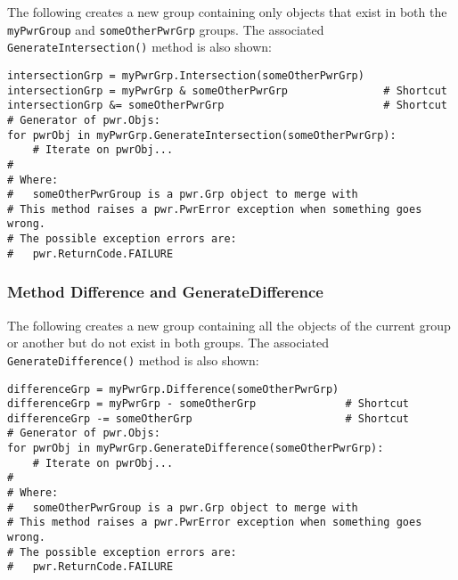 \documentclass[12pt]{report} %
\providecommand{\DIFdeltex}[1]{{\protect\color{red}\sout{#1}}}                      %
\providecommand{\DIFaddbegin}{} %
\providecommand{\DIFaddend}{} %
\providecommand{\DIFdelbegin}{} %
\providecommand{\DIFdelend}{} %
\providecommand{\DIFdel}[1]{\texorpdfstring{\DIFdeltex{#1}}{}} %
\newcommand{\DIFscaledelfig}{0.5}
\newlength{\DIFdelgraphicswidth} %
\newlength{\DIFdelgraphicsheight} %
\newcommand{\DIFaddincludegraphics}[2][]{{\color{blue}\fbox{\DIFOincludegraphics[#1]{#2}}}} %
\newcommand{\DIFdelincludegraphics}[2][]{%
\sbox{\DIFdelgraphicsbox}{\DIFOincludegraphics[#1]{#2}}%
\settoboxwidth{\DIFdelgraphicswidth}{\DIFdelgraphicsbox} %
\settoboxtotalheight{\DIFdelgraphicsheight}{\DIFdelgraphicsbox} %
\scalebox{\DIFscaledelfig}{%
\parbox[b]{\DIFdelgraphicswidth}{\usebox{\DIFdelgraphicsbox}\\[-\baselineskip] \rule{\DIFdelgraphicswidth}{0em}}\llap{\resizebox{\DIFdelgraphicswidth}{\DIFdelgraphicsheight}{%
\setlength{\unitlength}{\DIFdelgraphicswidth}%
\begin{picture}(1,1)%
\thicklines\linethickness{2pt} %
{\color[rgb]{1,0,0}\put(0,0){\framebox(1,1){}}}%
{\color[rgb]{1,0,0}\put(0,0){\line( 1,1){1}}}%
{\color[rgb]{1,0,0}\put(0,1){\line(1,-1){1}}}%
\end{picture}%
}\hspace*{3pt}}} %
} %
\DeclareRobustCommand{\DIFaddbegin}{\DIFOaddbegin \let\includegraphics\DIFaddincludegraphics} %
\DeclareRobustCommand{\DIFaddend}{\DIFOaddend \let\includegraphics\DIFOincludegraphics} %
\DeclareRobustCommand{\DIFdelbegin}{\DIFOdelbegin \let\includegraphics\DIFdelincludegraphics} %
\DeclareRobustCommand{\DIFdelend}{\DIFOaddend \let\includegraphics\DIFOincludegraphics} %
\begin{document}
\begin{appendices}
The following creates a new group containing only objects that exist in both the
\texttt{myPwrGroup} and \DIFdelbegin \DIFdel{\textttsomeOtherPwrGrp}%
\DIFdelend \DIFaddbegin \texttt{someOtherPwrGrp} \DIFaddend groups. The associated
\texttt{GenerateIntersection()} method is also shown:

\begin{center}\begin{minipage}{.95\linewidth}\begin{lstlisting}
intersectionGrp = myPwrGrp.Intersection(someOtherPwrGrp)
intersectionGrp = myPwrGrp & someOtherPwrGrp               # Shortcut
intersectionGrp &= someOtherPwrGrp                         # Shortcut
# Generator of pwr.Objs:
for pwrObj in myPwrGrp.GenerateIntersection(someOtherPwrGrp):
    # Iterate on pwrObj...
#
# Where:
#   someOtherPwrGroup is a pwr.Grp object to merge with
# This method raises a pwr.PwrError exception when something goes wrong.
# The possible exception errors are:
#   pwr.ReturnCode.FAILURE
\end{lstlisting}\end{minipage}\end{center}

\subsubsection{Method Difference and GenerateDifference} \label{meth:Difference}

The following creates a new group containing all the objects of the current
group or another but do not exist in both groups. The associated
\texttt{GenerateDifference()} method is also shown:

\begin{center}\begin{minipage}{.95\linewidth}\begin{lstlisting}
differenceGrp = myPwrGrp.Difference(someOtherPwrGrp)
differenceGrp = myPwrGrp - someOtherGrp              # Shortcut
differenceGrp -= someOtherGrp                        # Shortcut
# Generator of pwr.Objs:
for pwrObj in myPwrGrp.GenerateDifference(someOtherPwrGrp):
    # Iterate on pwrObj...
#
# Where:
#   someOtherPwrGroup is a pwr.Grp object to merge with
# This method raises a pwr.PwrError exception when something goes wrong.
# The possible exception errors are:
#   pwr.ReturnCode.FAILURE
\end{lstlisting}\end{minipage}\end{center}


\end{appendices}
\end{document}
